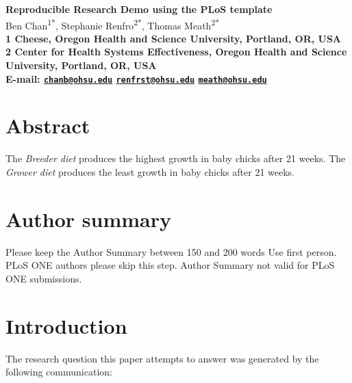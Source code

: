 \documentclass[10pt]{article}
\date{}
\begin{document}
\begin{flushleft}
{\Large
\textbf{Reproducible Research Demo using the PLoS template}
}
\\
  Ben Chan\textsuperscript{1*},
  Stephanie Renfro\textsuperscript{2*},
  Thomas Meath\textsuperscript{2*}\\
\bf{1} Cheese, Oregon Health and Science University,  Portland,  OR,  USA
\\
\bf{2} Center for Health Systems Effectiveness, Oregon Health and Science University,  Portland,  OR,  USA
\\

\textasteriskcentered{} E-mail:   \href{mailto:chanb@ohsu.edu}{\nolinkurl{chanb@ohsu.edu}}
  \href{mailto:renfrst@ohsu.edu}{\nolinkurl{renfrst@ohsu.edu}}
  \href{mailto:meath@ohsu.edu}{\nolinkurl{meath@ohsu.edu}}

\end{flushleft}

\section*{Abstract}\label{abstract}

The \emph{Breeder diet} produces the highest growth in baby chicks after
21 weeks. The \emph{Grower diet} produces the least growth in baby
chicks after 21 weeks.

\section*{Author summary}\label{author-summary}

Please keep the Author Summary between 150 and 200 words Use first
person. PLoS ONE authors please skip this step. Author Summary not valid
for PLoS ONE submissions.

\section*{Introduction}\label{introduction}

The research question this paper attempts to answer was generated by the
following communication:
\end{document}
